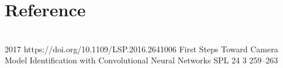 \section*{Reference}

\begin{publications}
  \\

  {
  }
  {2017}
  {https://doi.org/10.1109/LSP.2016.2641006}
  {First Steps Toward Camera Model Identification with Convolutional Neural Networks}
  {SPL}
  {24}
  {3}
  {259--263}
  {}
  \\

\end{publications}




